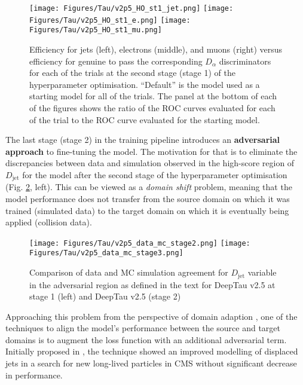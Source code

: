 \begin{figure}[!t]
    \centering
    \texttt{[image: Figures/Tau/v2p5\_HO\_st1\_jet.png]}
    \texttt{[image: Figures/Tau/v2p5\_HO\_st1\_e.png]}
    \texttt{[image: Figures/Tau/v2p5\_HO\_st1\_mu.png]}
    \caption{Efficiency for jets (left), electrons (middle), and muons (right) versus efficiency for genuine \tauh to pass the corresponding $D_\alpha$ discriminators for each of the trials at the second stage (stage 1) of the hyperparameter optimisation. \enquote{Default} is the model used as a starting model for all of the trials. The panel at the bottom of each of the figures shows the ratio of the ROC curves evaluated for each of the trial to the ROC curve evaluated for the starting model.}
    \label{fig:v2p5_HO_stage1_performance}
\end{figure}

The last stage (stage 2) in the training pipeline introduces an \textbf{adversarial approach} to fine-tuning the model. The motivation for that is to eliminate the discrepancies between data and simulation observed in the high-score region of $D_{\text{jet}}$ for the model after the second stage of the hyperparameter optimisation (Fig. \ref{fig:v2p5_data_mc}, left). This can be viewed as a \textit{domain shift} problem, meaning that the model performance does not transfer from the source domain on which it was trained (simulated data) to the target domain on which it is eventually being applied (collision data).

\begin{figure}[!t]
    \centering
    \texttt{[image: Figures/Tau/v2p5\_data\_mc\_stage2.png]}
    \texttt{[image: Figures/Tau/v2p5\_data\_mc\_stage3.png]}
    \caption{Comparison of data and MC simulation agreement for $D_{\text{jet}}$ variable in the adversarial region as defined in the text for DeepTau v2.5 at stage 1 (left) and DeepTau v2.5 (stage 2)}
    \label{fig:v2p5_data_mc}
\end{figure}

Approaching this problem from the perspective of domain adaption \cite{wang2018deep}, one of the techniques to align the model's performance between the source and target domains is to augment the loss function with an additional adversarial term. Initially proposed in \cite{ganin2015unsupervised, Louppe:2016ylz}, the technique showed an improved modelling of displaced jets in a search for new long-lived particles in CMS \cite{CMS:2019dqq} without significant decrease in performance.  

